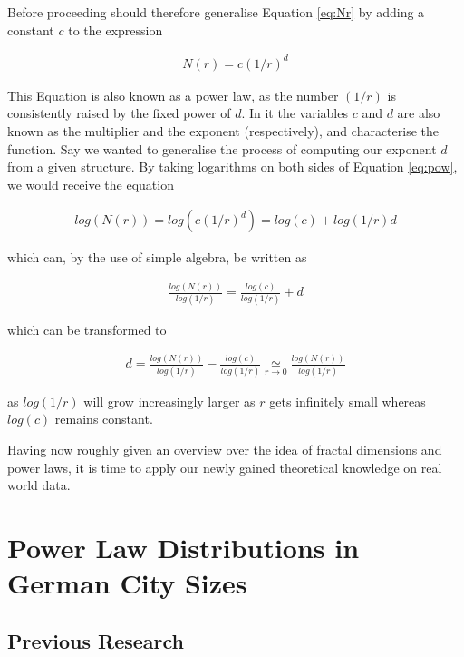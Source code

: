 \documentclass{article}[12pt]
\begin{document}
Before proceeding should therefore generalise Equation \ref{eq:Nr} by adding a constant $c$ to the expression 

\begin{align}
N(r) = c(1/r)^d
\label{eq:pow}
\end{align}

This Equation is also known as a power law, as the number $(1/r)$ is consistently raised by the fixed power of $d$. In it the variables $c$ and $d$ are also known as the multiplier and the exponent (respectively), and characterise the function.
Say we wanted to generalise the process of computing our exponent $d$ from a given structure. By taking logarithms on both sides of Equation \ref{eq:pow}, we would receive the equation

\begin{align}
log(N(r)) = log(c(1/r)^d)
= log(c) + log(1/r)d
\label{eq:d_comp}
\end{align}

which can, by the use of simple algebra, be written as

\begin{align}
\frac{log(N(r))}{log(1/r)} = \frac{log(c)}{log(1/r)}+d
\end{align}

which can be transformed to

\begin{align}
d = \frac{log(N(r))}{log(1/r)} - \frac{log(c)}{log(1/r)} \underset{r \to 0}{\simeq} \frac{log(N(r))}{log(1/r)}
\end{align}

as $log(1/r)$ will grow increasingly larger as $r$ gets infinitely small whereas $log(c)$ remains constant. 

Having now roughly given an overview over the idea of fractal dimensions and power laws, it is time to apply our newly gained theoretical knowledge on real world data.

\section{Power Law Distributions in German City Sizes}
\subsection{Previous Research}
\end{document}
